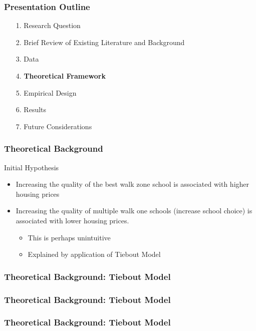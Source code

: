 \documentclass{beamer}
\begin{document}
\begin{frame}
\label{Presentation Outline 4}
\frametitle{Presentation Outline}
\begin{enumerate}
\item[1.] Research Question
\newline
\item[2.] Brief Review of Existing Literature and Background
\newline
\item[3.] Data
\newline
\item[4.] \textbf{Theoretical Framework}
\newline
\item[5.] Empirical Design
\newline
\item[6.] Results
\newline
\item[7.] Future Considerations
\end{enumerate}
\end{frame}

\begin{frame}
\label{Theoretical Background}
\frametitle{Theoretical Background}
Initial Hypothesis
\begin{itemize}
\item Increasing the quality of the best walk zone school is associated with higher housing prices \newline
\item Increasing the quality of multiple walk one schools (increase school choice) is associated with lower housing prices.
	\begin{itemize}
		\item This is perhaps unintuitive
		\item Explained by application of Tiebout Model
	\end{itemize}
\end{itemize}
\end{frame}

\begin{frame}
\label{Theoretical Background: Tiebout Model}
\frametitle{Theoretical Background: Tiebout Model}
\end{frame}

\begin{frame}
\label{Theoretical Background: Tiebout Model}
\frametitle{Theoretical Background: Tiebout Model}
\end{frame}

\begin{frame}
\label{Theoretical Background: Tiebout Model}
\frametitle{Theoretical Background: Tiebout Model}
\end{frame}
\end{document}
